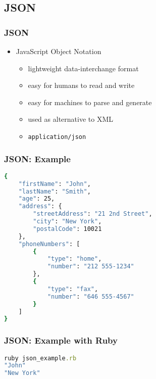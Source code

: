 \documentclass{beamer}
\begin{document}
\subsection{JSON}
\begin{frame}[fragile]\frametitle{JSON} 

  \begin{itemize}
    \item JavaScript Object Notation
    \begin{itemize}
      \item lightweight data-interchange format
      \item easy for humans to read and write
      \item easy for machines to parse and generate
      \item used as alternative to XML
      \item \texttt{application/json}
    \end{itemize}
  \end{itemize}
 

\end{frame}




\begin{frame}[fragile]\frametitle{JSON: Example} 
  
  \begin{lstlisting}[language=bash, escapechar={^}]
{
    "firstName": "John",
    "lastName": "Smith",
    "age": 25,
    "address": {
        "streetAddress": "21 2nd Street",
        "city": "New York",
        "postalCode": 10021
    },
    "phoneNumbers": [
        {
            "type": "home",
            "number": "212 555-1234"
        },
        {
            "type": "fax",
            "number": "646 555-4567"
        }
    ]
}
  \end{lstlisting}

\end{frame}
  




\begin{frame}[fragile]\frametitle{JSON: Example with Ruby} 
  
  
  
  \begin{lstlisting}[language=ruby, escapechar={^}]
ruby json_example.rb 
"John"
"New York"
  \end{lstlisting}

\end{frame}
  
\end{document}
